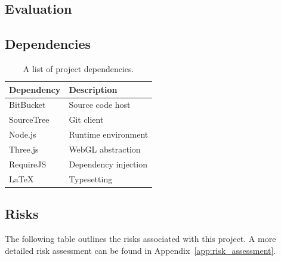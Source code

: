\documentclass[
	fontsize=11pt
	headlines=2,
	footlines=2,
	parskip=half
]{scrartcl}
\begin{document}
{{		}

		\subsection{Evaluation} {
		\label{sec:evaluation}


		}
		
		\subsection{Dependencies} {
		\label{sec:dependencies}
		
			\begin{table}[H]
			\caption{A list of project dependencies.}
			\begin{tabularx}{\textwidth}{@{}XX@{}}
				\toprule
				\textbf{Dependency} & \textbf{Description} \\
				\midrule
				BitBucket & Source code host \\
				SourceTree & Git client \\
				Node.js & Runtime environment \\
				Three.js & WebGL abstraction \\
				RequireJS & Dependency injection \\
				LaTeX & Typesetting \\
				\bottomrule
			\end{tabularx}
			\end{table}
		
		}
		
		\subsection{Risks} {
		\label{sec:risks}

			The following table outlines the risks associated with this project. A more detailed risk assessment can be found in Appendix~\ref{app:risk_assessment}.
			
}}
\end{document}

